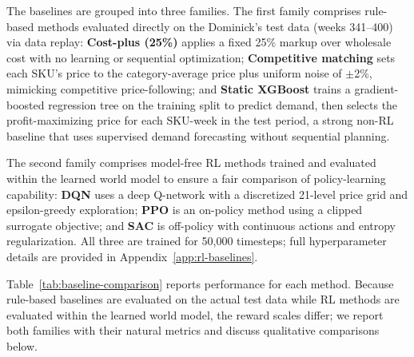 The baselines are grouped into three families. The first family comprises rule-based methods evaluated directly on the Dominick's test data (weeks 341--400) via data replay: \textbf{Cost-plus (25\%)} applies a fixed 25\% markup over wholesale cost with no learning or sequential optimization; \textbf{Competitive matching} sets each SKU's price to the category-average price plus uniform noise of $\pm$2\%, mimicking competitive price-following; and \textbf{Static XGBoost} trains a gradient-boosted regression tree \citep{friedman2001greedy} on the training split to predict demand, then selects the profit-maximizing price for each SKU-week in the test period, a strong non-RL baseline that uses supervised demand forecasting without sequential planning.

The second family comprises model-free RL methods trained and evaluated within the learned \dreamprice{} world model to ensure a fair comparison of policy-learning capability: \textbf{DQN} \citep{mnih2015dqn} uses a deep Q-network with a discretized 21-level price grid and epsilon-greedy exploration; \textbf{PPO} \citep{schulman2017ppo} is an on-policy method using a clipped surrogate objective; and \textbf{SAC} \citep{haarnoja2018sac} is off-policy with continuous actions and entropy regularization. All three are trained for 50{,}000 timesteps; full hyperparameter details are provided in Appendix~\ref{app:rl-baselines}.

Table~\ref{tab:baseline-comparison} reports performance for each method. Because rule-based baselines are evaluated on the actual test data while RL methods are evaluated within the learned world model, the reward scales differ; we report both families with their natural metrics and discuss qualitative comparisons below.

